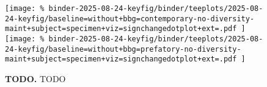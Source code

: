 \begin{figure*}

\texttt{[image: \%
binder-2025-08-24-keyfig/binder/teeplots/2025-08-24-keyfig/baseline=without+bbg=contemporary-no-diversity-maint+subject=specimen+viz=signchangedotplot+ext=.pdf
]}%
\texttt{[image: \%
binder-2025-08-24-keyfig/binder/teeplots/2025-08-24-keyfig/baseline=without+bbg=prefatory-no-diversity-maint+subject=specimen+viz=signchangedotplot+ext=.pdf
]}

\vspace{-1ex}

\caption{
\textbf{TODO.}
TODO
}
\label{fig:sign-change-nodmaint}

\end{figure*}
